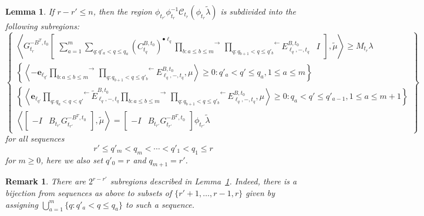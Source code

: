 \documentclass{amsart}
\newtheorem{lemma}[theorem]{Lemma}
\newtheorem{remark}[theorem]{Remark}
\numberwithin{theorem}{section}
\newcommand{\bfe}{\boldsymbol{e}}
\newcommand{\cC}{\mathcal{C}}
\begin{document}
  \begin{lemma}
    \label{le:first n steps}
    If $r-r' \le n$, then the region $\phi_{t_{r'}}\phi^{-1}_{t_r}\cC_{t_r}(\phi_{t_r}\tilde\lambda)$ is subdivided into the following subregions:
    \[
      \left\{\substack{
        \left\langle G^{-B^T,t_0}_{t_r} \left[\begin{array}{cc} \sum\limits_{a=1}^m \sum\limits_{q:q'_a < q \le q_a} (C^{B,t_0}_{t_q})^{\bullet \ell_q} \stackrel{\rightarrow}{\prod\limits_{b:a\le b\le m}}\, \stackrel{\leftarrow}{\prod\limits_{q:q_{b+1} < q \le q'_b}} E^{B,t_0}_{\ell_q,-,t_q} & I \end{array} \right] , \tilde\mu\right\rangle \ge M_{t_r}\lambda\\
        \left\{\left\langle -\bfe_{\ell_{q'}} \stackrel{\rightarrow}{\prod\limits_{b:a\le b\le m}}\, \stackrel{\leftarrow}{\prod\limits_{q:q_{b+1} < q \le q'_b}} E^{B,t_0}_{\ell_q,-,t_q} ,\mu \right\rangle \ge 0:q'_a < q'\le q_a,1\le a\le m\right\}\\
        \left\{\left\langle \bfe_{\ell_{q'}} \stackrel{\leftarrow}{\prod\limits_{q:q_a < q < q'}} \tilde E^{B,t_0}_{\ell_q,-,t_q} \stackrel{\rightarrow}{\prod\limits_{b:a\le b\le m}}\, \stackrel{\leftarrow}{\prod\limits_{q:q_{b+1} < q \le q'_b}} E^{B,t_0}_{\ell_q,-,t_q} ,\mu \right\rangle \ge 0:q_a < q' \le q'_{a-1},1\le a\le m+1\right\}\\
        \left\langle \left[\begin{array}{cc} -I & B_{t_{r'}} G^{-B^T,t_0}_{t_{r'}} \end{array}\right], \tilde\mu\right\rangle = \left[\begin{array}{cc} -I & B_{t_{r'}} G^{-B^T,t_0}_{t_{r'}} \end{array}\right] \phi_{t_{r'}}\tilde\lambda
      }\right\}
    \]
    for all sequences 
    \[r'\le q'_m < q_m < \cdots < q'_1 < q_1\le r\]
    for $m\ge0$, here we also set $q'_0=r$ and $q_{m+1}=r'$.
  \end{lemma}
  \begin{remark}
    There are $2^{r-r'}$ subregions described in Lemma~\ref{le:first n steps}.  Indeed, there is a bijection from sequences as above to subsets of $\{r'+1,\ldots,r-1,r\}$ given by assigning $\bigcup_{a=1}^m \{q:q'_a < q \le q_a\}$ to such a sequence.
  \end{remark}
\end{document}
